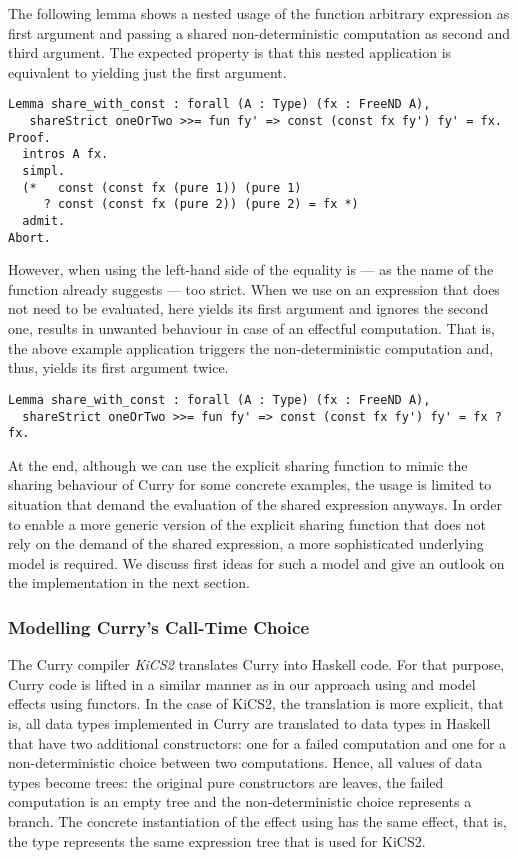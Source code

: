 The following lemma shows a nested usage of the function  arbitrary expression as first argument and passing a shared non-deterministic computation as second and third argument.
The expected property is that this nested application is equivalent to yielding just the first argument.

\begin{verbatim}
Lemma share_with_const : forall (A : Type) (fx : FreeND A),
   shareStrict oneOrTwo >>= fun fy' => const (const fx fy') fy' = fx.
Proof.
  intros A fx.
  simpl.
  (*   const (const fx (pure 1)) (pure 1)
     ? const (const fx (pure 2)) (pure 2) = fx *)
  admit.
Abort.
\end{verbatim}

However, when using  the left-hand side of the equality is --- as the name of the function already suggests --- too strict.
When we use  on an expression that does not need to be evaluated, here  yields its first argument and ignores the second one, results in unwanted behaviour in case of an effectful computation.
That is, the above example application triggers the non-deterministic computation  and, thus, yields its first argument  twice.

\begin{verbatim}
Lemma share_with_const : forall (A : Type) (fx : FreeND A),
  shareStrict oneOrTwo >>= fun fy' => const (const fx fy') fy' = fx ? fx.
\end{verbatim}

At the end, although we can use the explicit sharing function  to mimic the sharing behaviour of Curry for some concrete examples, the usage is limited to situation that demand the evaluation of the shared expression anyways.
In order to enable a more generic version of the explicit sharing function that does not rely on the demand of the shared expression, a more sophisticated underlying model is required.
We discuss first ideas for such a model and give an outlook on the implementation in the next section.

\subsubsection{Modelling Curry's Call-Time Choice}

The Curry compiler \emph{KiCS2} translates Curry into Haskell code.
For that purpose, Curry code is lifted in a similar manner as in our approach using  and model effects using functors.
In the case of KiCS2, the translation is more explicit, that is, all data types implemented in Curry are translated to data types in Haskell that have two additional constructors: one for a failed computation and one for a non-deterministic choice between two computations.
Hence, all values of data types become trees: the original pure constructors are leaves, the failed computation is an empty tree and the non-deterministic choice represents a branch.
The concrete instantiation of the effect using  has the same effect, that is, the type  represents the same expression tree that is used for KiCS2.

